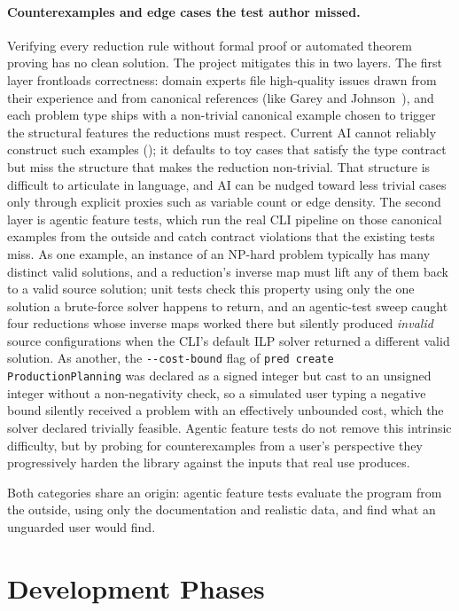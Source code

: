 \documentclass{article}
\begin{document}
\paragraph{Counterexamples and edge cases the test author missed.}
Verifying every reduction rule without formal proof or automated theorem proving has no clean solution. The project mitigates this in two layers. The first layer frontloads correctness: domain experts file high-quality issues drawn from their experience and from canonical references (like Garey and Johnson~\cite{garey1979}), and each problem type ships with a non-trivial canonical example chosen to trigger the structural features the reductions must respect. Current AI cannot reliably construct such examples (); it defaults to toy cases that satisfy the type contract but miss the structure that makes the reduction non-trivial. That structure is difficult to articulate in language, and AI can be nudged toward less trivial cases only through explicit proxies such as variable count or edge density. The second layer is agentic feature tests, which run the real CLI pipeline on those canonical examples from the outside and catch contract violations that the existing tests miss. As one example, an instance of an NP-hard problem typically has many distinct valid solutions, and a reduction's inverse map must lift any of them back to a valid source solution; unit tests check this property using only the one solution a brute-force solver happens to return, and an agentic-test sweep caught four reductions whose inverse maps worked there but silently produced \emph{invalid} source configurations when the CLI's default ILP solver returned a different valid solution. As another, the \texttt{-{}-cost-bound} flag of \texttt{pred create ProductionPlanning} was declared as a signed integer but cast to an unsigned integer without a non-negativity check, so a simulated user typing a negative bound silently received a problem with an effectively unbounded cost, which the solver declared trivially feasible. Agentic feature tests do not remove this intrinsic difficulty, but by probing for counterexamples from a user's perspective they progressively harden the library against the inputs that real use produces.

Both categories share an origin: agentic feature tests evaluate the program from the outside, using only the documentation and realistic data, and find what an unguarded user would find.

\section{Development Phases}\label{app:phases}
\end{document}
